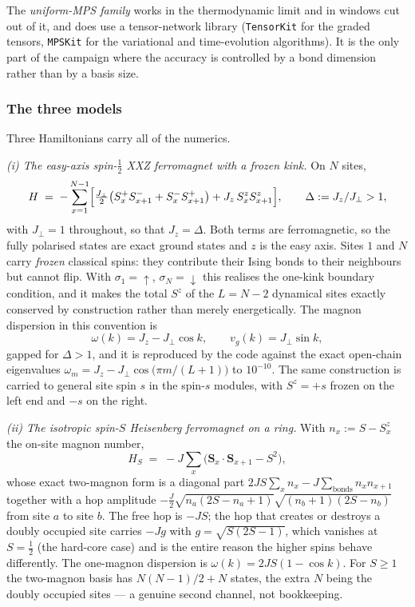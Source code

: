 The \emph{uniform-MPS family} works in the thermodynamic limit and in windows
cut out of it, and does use a tensor-network library (\texttt{TensorKit} for
the graded tensors, \texttt{MPSKit} for the variational and time-evolution
algorithms). It is the only part of the campaign where the accuracy is
controlled by a bond dimension rather than by a basis size.

\subsubsection{The three models}

Three Hamiltonians carry all of the numerics.

\emph{(i) The easy-axis spin-$\tfrac12$ XXZ ferromagnet with a frozen kink.}
On $N$ sites,
\begin{equation}
  H \;=\; -\sum_{x=1}^{N-1}\Bigl[\tfrac{J_\perp}{2}\bigl(S^+_xS^-_{x+1}
      + S^-_xS^+_{x+1}\bigr) + J_z\,S^z_xS^z_{x+1}\Bigr],
  \qquad \Delta := J_z/J_\perp > 1,
  \label{eq:num-xxz}
\end{equation}
with $J_\perp = 1$ throughout, so that $J_z=\Delta$. Both terms are
ferromagnetic, so the fully polarised states are exact ground states and $z$
is the easy axis. Sites $1$ and $N$ carry \emph{frozen} classical spins: they
contribute their Ising bonds to their neighbours but cannot flip. With
$\sigma_1=\uparrow$, $\sigma_N=\downarrow$ this realises the one-kink boundary
condition, and it makes the total $S^z$ of the $L=N-2$ dynamical sites exactly
conserved by construction rather than merely energetically. The magnon
dispersion in this convention is
\begin{equation}
  \omega(k) = J_z - J_\perp\cos k, \qquad v_g(k) = J_\perp \sin k,
  \label{eq:num-xxz-disp}
\end{equation}
gapped for $\Delta>1$, and it is reproduced by the code against the exact
open-chain eigenvalues $\omega_m = J_z - J_\perp\cos\bigl(\pi m/(L+1)\bigr)$
to $10^{-10}$. The same construction is carried to general site spin $s$ in
the spin-$s$ modules, with $S^z=+s$ frozen on the left end and $-s$ on the
right.

\emph{(ii) The isotropic spin-$S$ Heisenberg ferromagnet on a ring.} With
$n_x := S - S^z_x$ the on-site magnon number,
\begin{equation}
  H_S \;=\; -J\sum_x\bigl(\mathbf{S}_x\cdot\mathbf{S}_{x+1} - S^2\bigr),
  \label{eq:num-fm}
\end{equation}
whose exact two-magnon form is a diagonal part
$2JS\sum_x n_x - J\sum_{\text{bonds}} n_xn_{x+1}$ together with a hop
amplitude $-\tfrac{J}{2}\sqrt{n_a(2S-n_a+1)}\sqrt{(n_b+1)(2S-n_b)}$ from site
$a$ to site $b$. The free hop is $-JS$; the hop that creates or destroys a
doubly occupied site carries $-Jg$ with $g=\sqrt{S(2S-1)}$, which vanishes at
$S=\tfrac12$ (the hard-core case) and is the entire reason the higher spins
behave differently. The one-magnon dispersion is $\omega(k)=2JS(1-\cos k)$.
For $S\geq 1$ the two-magnon basis has $N(N-1)/2 + N$ states, the extra $N$
being the doubly occupied sites --- a genuine second channel, not
bookkeeping.

